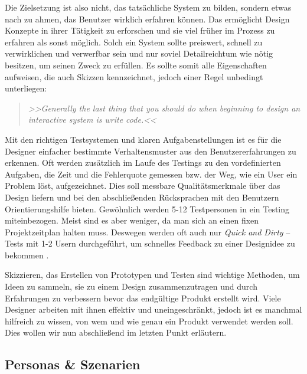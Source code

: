 Die Zielsetzung ist also nicht, das tatsächliche System zu bilden, sondern etwas nach zu ahmen, das Benutzer wirklich erfahren können. Das ermöglicht Design Konzepte in ihrer Tätigkeit zu erforschen und sie viel früher im Prozess zu erfahren als sonst möglich. Solch ein System sollte preiswert, schnell zu verwirklichen und verwerfbar sein und nur soviel Detailreichtum wie nötig besitzen, um seinen Zweck zu erfüllen. Es sollte somit alle Eigenschaften aufweisen, die auch Skizzen kennzeichnet, jedoch einer Regel unbedingt unterliegen: 

\begin{quote}
	\textsl{>>Generally the last thing that you should do when beginning to design an interactive system is write code.<<}
\begin{flushright}\citep{Buxton:2007}\end{flushright}
\end{quote}	

Mit den richtigen Testsystemen und klaren Aufgabenstellungen ist es für die Designer einfacher bestimmte Verhaltensmuster aus den Benutzererfahrungen zu erkennen. Oft werden zusätzlich im Laufe des Testings zu den vordefinierten Aufgaben, die Zeit und die Fehlerquote gemessen bzw. der Weg, wie ein User ein Problem löst, aufgezeichnet. Dies soll messbare Qualitätsmerkmale über das Design liefern und bei den abschließenden Rücksprachen mit den Benutzern Orientierungshilfe bieten.
Gewöhnlich werden 5-12 Testpersonen in ein Testing miteinbezogen. \citep{Dumas:1999} Meist sind es aber weniger, da man sich an einen fixen Projektzeitplan halten muss. Deswegen werden oft auch nur \emph{Quick and Dirty} – Tests mit 1-2 Usern durchgeführt, um schnelles Feedback zu einer Designidee zu bekommen \citep{Sharp:2002}.

\medskip Skizzieren, das Erstellen von Prototypen und Testen sind wichtige Methoden, um Ideen zu sammeln, sie zu einem Design zusammenzutragen und durch Erfahrungen zu verbessern bevor das endgültige Produkt erstellt wird. Viele Designer arbeiten mit ihnen effektiv und uneingeschränkt, jedoch ist es manchmal hilfreich zu wissen, von wem und wie genau ein Produkt verwendet werden soll. Dies wollen wir nun abschließend im letzten Punkt erläutern.

\subsection{Personas \& Szenarien}

